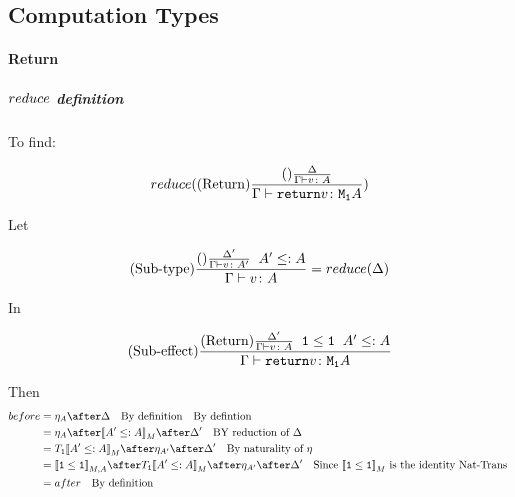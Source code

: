 {        \subsection{Computation Types}
            \paragraph{Return}
            \subparagraph{$reduce$ definition}
            To find:
            
                \begin{equation}
                    reduce((\text{Return}) \frac{
                        (\text{}) \frac{\Delta}{\Gamma \vdash v \colon A}
                    }{\Gamma \vdash \texttt{return} v \colon \texttt{M}_{\texttt{1}}{A}})
                \end{equation}

                Let 

                \begin{equation}
                    (\text{Sub-type}) \frac{
                        (\text{}) \frac{\Delta'}{\Gamma \vdash v \colon A'}
                        \;\;
                        A' \leq: A
                    }{
                        \Gamma \vdash v \colon A
                    } = reduce(\Delta)
                \end{equation}

                In

                \begin{equation}
                    (\text{Sub-effect}) \frac{
                        (\text{Return}) \frac{
                            \Delta'
                        }{
                            \Gamma \vdash v \colon A
                        }
                        \;\;
                        \texttt{1}\leq\texttt{1}
                        \;\;
                        A'\leq: A
                    }{
                        \Gamma \vdash \texttt{return} v \colon \texttt{M}_{\texttt{1}}{A}
                    }
                \end{equation}


                Then
                \begin{align}
                    before &= \point{A}\after\D\qt{By definition}\qt{By defintion}\\
                    &{}= \point{A}\after\deno{A'\subtype A}\after \D'\qt{BY reduction of $\D$}\\
                    &{}=\T{\1}{\deno{A'\subtype A}}\after \point{A'}\after\D'\qt{By naturality of $\point{}$}\\
                    &{}=\db{\1\subeffect\1}_{M, A} \after \T{\1}{\deno{A'\subtype A}}\after\point{A'}\after\D'\qt{Since $\deno{\1\subeffect\1}$ is the identity Nat-Trans }\\
                    &{}=after\qt{By definition}\\
                \end{align}
}
